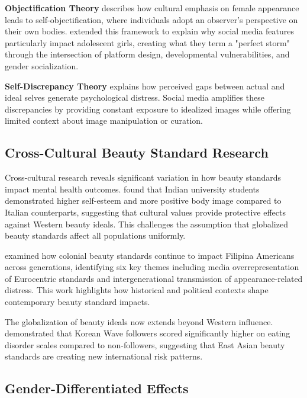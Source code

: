 \documentclass{article}
\begin{document}
\textbf{Objectification Theory} \citep{fredrickson1997} describes how cultural emphasis on female appearance leads to self-objectification, where individuals adopt an observer's perspective on their own bodies. \citet{choukas2022} extended this framework to explain why social media features particularly impact adolescent girls, creating what they term a "perfect storm" through the intersection of platform design, developmental vulnerabilities, and gender socialization.

\textbf{Self-Discrepancy Theory} \citep{higgins1987} explains how perceived gaps between actual and ideal selves generate psychological distress. Social media amplifies these discrepancies by providing constant exposure to idealized images while offering limited context about image manipulation or curation.

\subsection{Cross-Cultural Beauty Standard Research}

Cross-cultural research reveals significant variation in how beauty standards impact mental health outcomes. \citet{abdoli2025} found that Indian university students demonstrated higher self-esteem and more positive body image compared to Italian counterparts, suggesting that cultural values provide protective effects against Western beauty ideals. This challenges the assumption that globalized beauty standards affect all populations uniformly.

\citet{tirona2023} examined how colonial beauty standards continue to impact Filipina Americans across generations, identifying six key themes including media overrepresentation of Eurocentric standards and intergenerational transmission of appearance-related distress. This work highlights how historical and political contexts shape contemporary beauty standard impacts.

The globalization of beauty ideals now extends beyond Western influence. \citet{kumari2024} demonstrated that Korean Wave followers scored significantly higher on eating disorder scales compared to non-followers, suggesting that East Asian beauty standards are creating new international risk patterns.

\subsection{Gender-Differentiated Effects}
\end{document}
